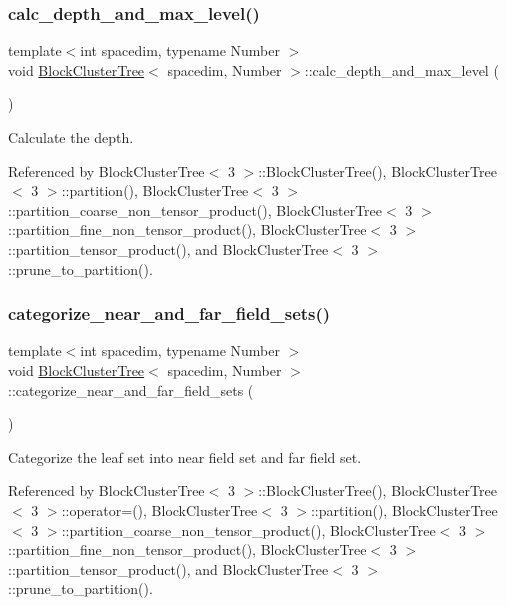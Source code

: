 \subsubsection{\texorpdfstring{calc\+\_\+depth\+\_\+and\+\_\+max\+\_\+level()}{calc\_depth\_and\_max\_level()}}
{\footnotesize\ttfamily template$<$int spacedim, typename Number $>$ \\
void \hyperlink{classBlockClusterTree}{Block\+Cluster\+Tree}$<$ spacedim, Number $>$\+::calc\+\_\+depth\+\_\+and\+\_\+max\+\_\+level (\begin{DoxyParamCaption}{ }\end{DoxyParamCaption})}

Calculate the depth. 

Referenced by Block\+Cluster\+Tree$<$ 3 $>$\+::\+Block\+Cluster\+Tree(), Block\+Cluster\+Tree$<$ 3 $>$\+::partition(), Block\+Cluster\+Tree$<$ 3 $>$\+::partition\+\_\+coarse\+\_\+non\+\_\+tensor\+\_\+product(), Block\+Cluster\+Tree$<$ 3 $>$\+::partition\+\_\+fine\+\_\+non\+\_\+tensor\+\_\+product(), Block\+Cluster\+Tree$<$ 3 $>$\+::partition\+\_\+tensor\+\_\+product(), and Block\+Cluster\+Tree$<$ 3 $>$\+::prune\+\_\+to\+\_\+partition().

\mbox{\label{classBlockClusterTree_a286bd48cc863cbba7c9ad53b6bdb12ca}} 
\subsubsection{\texorpdfstring{categorize\+\_\+near\+\_\+and\+\_\+far\+\_\+field\+\_\+sets()}{categorize\_near\_and\_far\_field\_sets()}}
{\footnotesize\ttfamily template$<$int spacedim, typename Number $>$ \\
void \hyperlink{classBlockClusterTree}{Block\+Cluster\+Tree}$<$ spacedim, Number $>$\+::categorize\+\_\+near\+\_\+and\+\_\+far\+\_\+field\+\_\+sets (\begin{DoxyParamCaption}{ }\end{DoxyParamCaption})}

Categorize the leaf set into near field set and far field set. 

Referenced by Block\+Cluster\+Tree$<$ 3 $>$\+::\+Block\+Cluster\+Tree(), Block\+Cluster\+Tree$<$ 3 $>$\+::operator=(), Block\+Cluster\+Tree$<$ 3 $>$\+::partition(), Block\+Cluster\+Tree$<$ 3 $>$\+::partition\+\_\+coarse\+\_\+non\+\_\+tensor\+\_\+product(), Block\+Cluster\+Tree$<$ 3 $>$\+::partition\+\_\+fine\+\_\+non\+\_\+tensor\+\_\+product(), Block\+Cluster\+Tree$<$ 3 $>$\+::partition\+\_\+tensor\+\_\+product(), and Block\+Cluster\+Tree$<$ 3 $>$\+::prune\+\_\+to\+\_\+partition().

